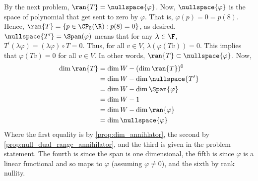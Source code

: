 \documentclass{book}
\begin{document}
\begin{enumerate}[label=\arabic*)]
    \ii
      By the next problem, $\ran{T} = \nullspace{\varphi}$. Now, $\nullspace{\varphi}$ is the space of polynomial that get sent to zero by $\varphi$. That is, $\varphi(p) = 0 = p(8)$. Hence,
      $\ran{T} = \{p \in \CP_5(\R): p(8) = 0\}$, as desired.
    \ii
      $\nullspace{T^{\prime}} = \Span(\varphi)$ means that for any $\lambda \in \F$, $T^{\prime}(\lambda\varphi) = (\lambda\varphi)\circ T = 0$. Thus, for all $v \in V$,
      $\lambda(\varphi(Tv)) = 0$. This implies that $\varphi(Tv) = 0$ for all $v \in V$. In other words, $\ran{T} \subset \nullspace{\varphi}$. Now,
      \begin{align*}
        \dim{\ran{T}} & = \dim{W} - (\dim{\ran{T}})^0 \\
        & = \dim{W} - \dim{\nullspace{T^{\prime}}} \\
        & = \dim{W} - \dim{\Span{\varphi}} \\
        & = \dim{W} - 1 \\
        & = \dim{W} - \dim{\ran{\varphi}} \\
        & = \dim{\nullspace{\varphi}}
      \end{align*}
      Where the first equality is by \eqref{prop:dim_annihlator}, the second by \eqref{prop:null_dual_range_annihilator}, and the third is given in the problem statement. The fourth is since
      the span is one dimensional, the fifth is since $\varphi$ is a linear functional and so maps to $\varphi$ (assuming $\varphi \neq 0$), and the sixth by rank nullity.
      

\end{enumerate}
\end{document}
